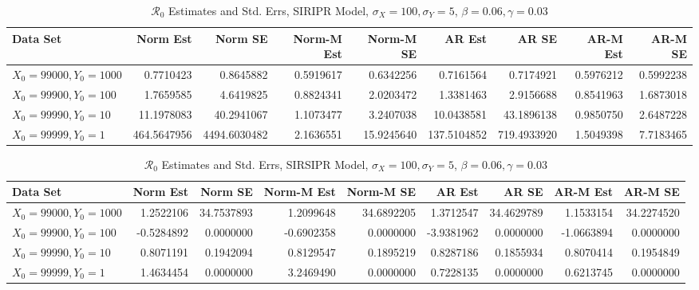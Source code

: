 \documentclass[12pt]{article}
\newcommand{\rr}{\ensuremath{\mathcal{R}_0}}
\begin{document}
\begin{table}[H]
	
	\caption{\label{tab:}$\rr$ Estimates and Std. Errs, SIRIPR Model,
		$\sigma_X = 100, \sigma_Y = 5$, $\beta = 0.06, \gamma = 0.03$}
	\centering
	\begin{footnotesize}
	\begin{tabular}[t]{l|r|r|r|r|r|r|r|r}
		\hline
		Data Set & Norm Est & Norm SE & Norm-M Est & Norm-M SE & AR Est & AR SE & AR-M Est & AR-M SE\\
		\hline
		$X_0 = 99000, Y_0 = 1000$ & 0.7710423 & 0.8645882 & 0.5919617 & 0.6342256 & 0.7161564 & 0.7174921 & 0.5976212 & 0.5992238\\
		\hline
		$X_0 = 99900, Y_0 = 100$ & 1.7659585 & 4.6419825 & 0.8824341 & 2.0203472 & 1.3381463 & 2.9156688 & 0.8541963 & 1.6873018\\
		\hline
		$X_0 = 99990, Y_0 = 10$ & 11.1978083 & 40.2941067 & 1.1073477 & 3.2407038 & 10.0438581 & 43.1896138 & 0.9850750 & 2.6487228\\
		\hline
		$X_0 = 99999, Y_0 = 1$ & 464.5647956 & 4494.6030482 & 2.1636551 & 15.9245640 & 137.5104852 & 719.4933920 & 1.5049398 & 7.7183465\\
		\hline
	\end{tabular}
\end{footnotesize}
\end{table}
\begin{table}[H]
	
	\caption{\label{tab:}$\rr$ Estimates and Std. Errs, SIRSIPR Model,
		$\sigma_X = 100, \sigma_Y = 5$, $\beta = 0.06, \gamma = 0.03$}
	\centering
	\begin{footnotesize}
	\begin{tabular}[t]{l|r|r|r|r|r|r|r|r}
		\hline
		Data Set & Norm Est & Norm SE & Norm-M Est & Norm-M SE & AR Est & AR SE & AR-M Est & AR-M SE\\
		\hline
		$X_0 = 99000, Y_0 = 1000$ & 1.2522106 & 34.7537893 & 1.2099648 & 34.6892205 & 1.3712547 & 34.4629789 & 1.1533154 & 34.2274520\\
		\hline
		$X_0 = 99900, Y_0 = 100$ & -0.5284892 & 0.0000000 & -0.6902358 & 0.0000000 & -3.9381962 & 0.0000000 & -1.0663894 & 0.0000000\\
		\hline
		$X_0 = 99990, Y_0 = 10$ & 0.8071191 & 0.1942094 & 0.8129547 & 0.1895219 & 0.8287186 & 0.1855934 & 0.8070414 & 0.1954849\\
		\hline
		$X_0 = 99999, Y_0 = 1$ & 1.4634454 & 0.0000000 & 3.2469490 & 0.0000000 & 0.7228135 & 0.0000000 & 0.6213745 & 0.0000000\\
		\hline
	\end{tabular}
\end{footnotesize}
\end{table}
\end{document}
